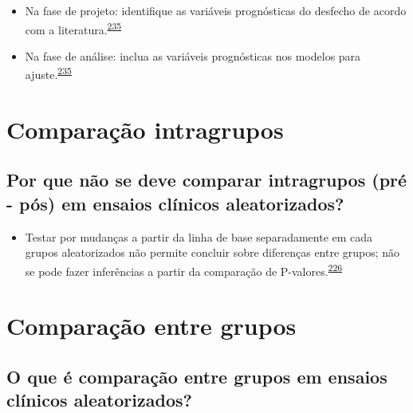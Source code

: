 \documentclass[
  a4paper,
]{book}
\providecommand{\tightlist}{%
  \setlength{\itemsep}{0pt}\setlength{\parskip}{0pt}}
\begin{document}
\begin{itemize}
\item
  Na fase de projeto: identifique as variáveis prognósticas do desfecho de acordo com a literatura.\textsuperscript{\protect\hyperlink{ref-roberts1999}{235}}
\item
  Na fase de análise: inclua as variáveis prognósticas nos modelos para ajuste.\textsuperscript{\protect\hyperlink{ref-roberts1999}{235}}
\end{itemize}

\hypertarget{comparacao-intragrupos}{%
\section{Comparação intragrupos}\label{comparacao-intragrupos}}

\hypertarget{por-que-nuxe3o-se-deve-comparar-intragrupos-pruxe9---puxf3s-em-ensaios-cluxednicos-aleatorizados}{%
\subsection{Por que não se deve comparar intragrupos (pré - pós) em ensaios clínicos aleatorizados?}\label{por-que-nuxe3o-se-deve-comparar-intragrupos-pruxe9---puxf3s-em-ensaios-cluxednicos-aleatorizados}}

\begin{itemize}
\tightlist
\item
  Testar por mudanças a partir da linha de base separadamente em cada grupos aleatorizados não permite concluir sobre diferenças entre grupos; não se pode fazer inferências a partir da comparação de P-valores.\textsuperscript{\protect\hyperlink{ref-bland2011}{226}}
\end{itemize}

\hypertarget{comparacao-entre-grupos}{%
\section{Comparação entre grupos}\label{comparacao-entre-grupos}}

\hypertarget{o-que-uxe9-comparauxe7uxe3o-entre-grupos-em-ensaios-cluxednicos-aleatorizados}{%
\subsection{O que é comparação entre grupos em ensaios clínicos aleatorizados?}\label{o-que-uxe9-comparauxe7uxe3o-entre-grupos-em-ensaios-cluxednicos-aleatorizados}}
\end{document}
